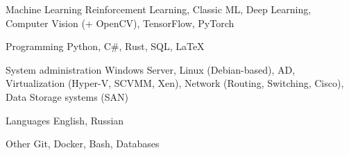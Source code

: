

\begin{cvskills}

  \cvskill
    {Machine Learning} %
    {Reinforcement Learning, Classic ML, Deep Learning, Computer Vision (+ OpenCV), TensorFlow, PyTorch} %

  \cvskill
    {Programming} %
    {Python, C\#, Rust, SQL, LaTeX} %
    
  \cvskill
	{System administration} %
	{Windows Server, Linux (Debian-based), AD, Virtualization (Hyper-V, SCVMM, Xen), Network (Routing, Switching, Cisco), Data Storage systems (SAN)} %

  \cvskill
    {Languages} %
    {English, Russian} %

  \cvskill
	{Other} %
	{Git, Docker, Bash, Databases} %

\end{cvskills}
